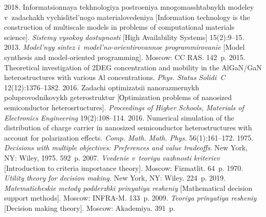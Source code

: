   \begin{multicols}{2}

\renewcommand{\bibname}{\protect\rmfamily References}

{\small\frenchspacing
 {%
 \begin{thebibliography}{99}
     2018. Informatsionnaya tekhnologiya postroeniya 
mnogomasshtabnykh modeley v~zadachakh vychislitel'nogo materialovedeniya 
[Information technology is the construction of multiscale models in problems of 
computational materials science]. \textit{Sistemy vysokoy do\-stup\-nosti} [High 
Availability Systems] 15(2):9--15.
     2013. \textit{Model'nyy sintez i~model'no-orientirovannoe 
programmirovanie} [Model synthesis and model-oriented programming]. Moscow: CC 
RAS. 142~p.
     2015. Theoretical 
investigation of 2DEG concentration and mobility in the AlGaN/GaN heterostructures 
with various Al concentrations. \textit{Phys. Status Solidi~C} 12(12):1376--1382.
     2016. Zadachi optimizatsii nanorazmernykh 
poluprovodnikovykh geterostruktur [Оptimization problems of nanosized 
semiconductor heterosrtuctures]. \textit{Proceedings of Higher Schools,
Materials 
of Electronics Engineering} 19(2):108--114.
     2016. Numerical simulation of the 
distribution of charge carrier in nanosized semiconductor heterostructures 
with account  for polarization effects. \textit{Comp. Math. Math. Phys.} 56(1):161--172.
     1975. \textit{Decisions with multiple objectives: 
    Preferences  and value tradeoffs}. New York, NY: Wiley, 1975. 592~p.
    2007. \textit{Vvedenie v~teoriyu vazhnosti kriteriev} [Introduction to 
criteria importance theory]. Moscow: Fizmatlit. 64~p.
    1970. \textit{Utility theory for decision making.} New York, NY: Wiley. 224~p.
     2019. \textit{Matematicheskie metody podderzhki 
prinyatiya resheniy} [Mathematical decision support methods]. Moscow: INFRA-M. 
133~p. 
     2009. \textit{Teoriya prinyatiya resheniy} 
    [Decision making theory]. Moscow: Akademiya. 391~p.
\end{thebibliography}

 }
 }

\end{multicols}

